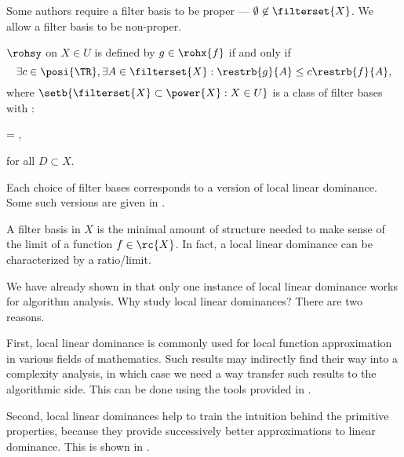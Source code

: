 \documentclass[b5paper, english, oneside]{memoir}
\begin{document}
\begin{note}
Some authors require a filter basis to be proper --- $\emptyset \not\in \filterset{X}$. We allow a filter basis to be non-proper.
\end{note}

\begin{definition}
 $\rohsy$ on $X \in U$ is defined by $g \in \rohx{f}$ if and only if
\begin{equation}
\exists c \in \posi{\TR}, \exists A \in \filterset{X}: \restrb{g}{A} \leq c \restrb{f}{A},
\end{equation}
where $\setb{\filterset{X} \subset \power{X} : X \in U}$ is a class of filter bases with :
\begin{eqs}
 = ,
\end{eqs}
for all $D \subset X$.
\end{definition}

\begin{note}[Versions]
Each choice of filter bases corresponds to a version of local linear dominance. Some such versions are given in .
\end{note}

\begin{note}
A filter basis in $X$ is the minimal amount of structure needed to make sense of the limit of a function $f \in \rc{X}$. In fact, a local linear dominance can be characterized by a ratio\-/limit.
\end{note}

\begin{note}[Motivation]
We have already shown in  that only one instance of local linear dominance works for algorithm analysis. Why study local linear dominances? There are two reasons.

First, local linear dominance is commonly used for local function approximation in various fields of mathematics. Such results may indirectly find their way into a complexity analysis, in which case we need a way transfer such results to the algorithmic side. This can be done using the tools provided in .

Second, local linear dominances help to train the intuition behind the primitive properties, because they provide successively better approximations to linear dominance. This is shown in .
\end{note}
\end{document}
